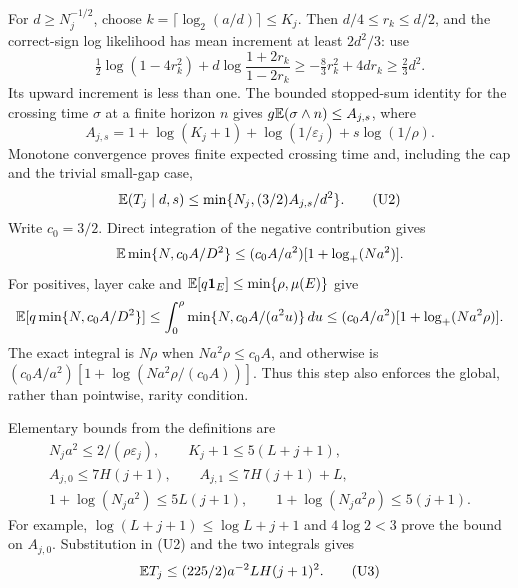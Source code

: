 For $d\ge N_j^{-1/2}$, choose $k=\lceil\log_2(a/d)\rceil\le K_j$.
Then $d/4\le r_k\le d/2$, and the correct-sign log likelihood has mean
increment at least $2d^2/3$: use
\[
 \tfrac12\log(1-4r_k^2)
       +d\log\frac{1+2r_k}{1-2r_k}
 \ge-\tfrac83r_k^2+4dr_k\ge\tfrac23d^2.
\]
Its upward increment is less than one. The bounded stopped-sum identity for
the crossing time $\sigma$ at a finite horizon $n$ gives
$g\mathbb E(\sigma\wedge n)\le A_{j,s}$, where
\[
 A_{j,s}=1+\log(K_j+1)+\log(1/\varepsilon_j)+s\log(1/\rho).
\]
Monotone convergence proves finite expected crossing time and, including the
cap and the trivial small-gap case,
\[
 \mathbb E(T_j\mid d,s)\le\min\{N_j,(3/2)A_{j,s}/d^2\}.        \tag{U2}
\]
Write $c_0=3/2$. Direct integration of the negative contribution gives
\[
 \mathbb E\min\{N,c_0A/D^2\}
 \le(c_0A/a^2)[1+\log_+(Na^2)].
\]
For positives, layer cake and
$\mathbb E[q\mathbf1_E]\le\min\{\rho,\mu(E)\}$ give
\[
 \mathbb E[q\min\{N,c_0A/D^2\}]
 \le\int_0^\rho\min\{N,c_0A/(a^2u)\}\,du
 \le(c_0A/a^2)[1+\log_+(Na^2\rho)].
\]
The exact integral is $N\rho$ when $Na^2\rho\le c_0A$, and otherwise is
$(c_0A/a^2)[1+\log(Na^2\rho/(c_0A))]$. Thus this step also enforces the
global, rather than pointwise, rarity condition.

Elementary bounds from the definitions are
\[
\begin{gathered}
 N_ja^2\le2/(\rho\varepsilon_j),\qquad K_j+1\le5(L+j+1),\\
 A_{j,0}\le7H(j+1),\qquad A_{j,1}\le7H(j+1)+L,\\
 1+\log(N_ja^2)\le5L(j+1),\qquad
 1+\log(N_ja^2\rho)\le5(j+1).
\end{gathered}
\]
For example, $\log(L+j+1)\le\log L+j+1$ and $4\log2<3$ prove the
bound on $A_{j,0}$. Substitution in (U2) and the two integrals gives
\[
 \mathbb E T_j\le(225/2)a^{-2}LH(j+1)^2.                        \tag{U3}
\]


